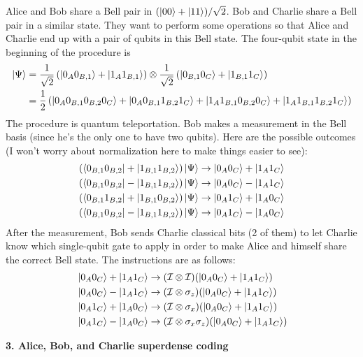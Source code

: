 \documentclass{article}
\theoremstyle{definition}
\newcommand{\f}[2]{\frac{#1}{#2}}
\newcommand{\lp}{\left(}
\newcommand{\rp}{\right)}
\newcommand{\Id}{\mathcal{I}}
\begin{document}
\noindent Alice and Bob share a Bell pair in $(\ket{00} + \ket{11})/\sqrt{2}$. Bob and Charlie share a Bell pair in a similar state. They want to perform some operations so that Alice and Charlie end up with a pair of qubits in this Bell state. The four-qubit state in the beginning of the procedure is 
\begin{align*}
	\ket{\Psi} &= \f{1}{\sqrt{2}} \lp \ket{0_A0_{B,1}} + \ket{1_A1_{B,1}} \rp \otimes \f{1}{\sqrt{2}}\lp  \ket{0_{B,1} 0_C} + \ket{1_{B,1}1_C} \rp \\
	&= \f{1}{2}\lp \ket{0_A0_{B,1}0_{B,2}0_{C}} + \ket{0_A0_{B,1}1_{B,2}1_C} + \ket{1_A1_{B,1}0_{B,2}0_C}+ \ket{1_A1_{B,1}1_{B,2}1_C} \rp
\end{align*}
The procedure is quantum teleportation. Bob makes a measurement in the Bell basis (since he's the only one to have two qubits). Here are the possible outcomes (I won't worry about normalization here to make things easier to see):
\begin{align*}
	&(\bra{0_{B,1}0_{B,2}} + \ket{1_{B,1}1_{B,2}}) \ket{\Psi} \to \ket{0_A 0_C} +  \ket{1_A 1_C} \\
	&(\bra{0_{B,1}0_{B,2}} - \ket{1_{B,1}1_{B,2}}) \ket{\Psi} \to \ket{0_A 0_C} -  \ket{1_A 1_C} \\
	&(\bra{0_{B,1}1_{B,2}} + \ket{1_{B,1}0_{B,2}}) \ket{\Psi} \to \ket{0_A 1_C} +  \ket{1_A 0_C}\\
	&(\bra{0_{B,1}0_{B,2}} - \ket{1_{B,1}1_{B,2}}) \ket{\Psi} \to \ket{0_A 1_C} -  \ket{1_A 0_C}
\end{align*}
After the measurement, Bob sends Charlie classical bits (2 of them) to let Charlie know which single-qubit gate to apply in order to make Alice and himself share the correct Bell state. The instructions are as follows:
\begin{align*}
	&\ket{0_A 0_C} +  \ket{1_A 1_C}  \to (\Id \otimes \Id)(\ket{0_A 0_C} +  \ket{1_A 1_C})\\
	&\ket{0_A 0_C} -  \ket{1_A 1_C} \to (\Id \otimes \sigma_z)(\ket{0_A 0_C} +  \ket{1_A 1_C})\\
	&\ket{0_A 1_C} +  \ket{1_A 0_C} \to (\Id \otimes \sigma_x)(\ket{0_A 0_C} +  \ket{1_A 1_C})\\
	&\ket{0_A 1_C} -  \ket{1_A 0_C} \to  (\Id \otimes \sigma_x\sigma_z)(\ket{0_A 0_C} +  \ket{1_A 1_C})
\end{align*}




\noindent \textbf{3. Alice, Bob, and Charlie superdense coding}\\
\end{document}
